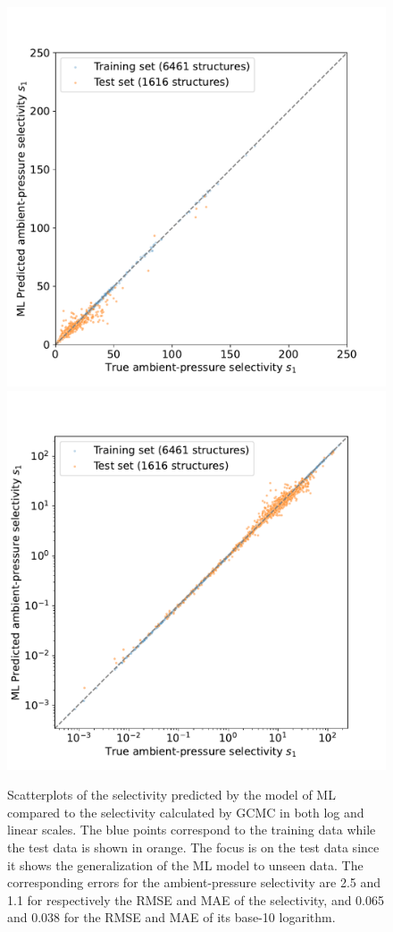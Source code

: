 \documentclass[main]{subfiles}
\begin{document}
\begin{figure}[ht]
  \centering
    \includegraphics[width=0.48\linewidth]{figures/4-ml/SI_figure/Scatterplot_S1_prediction.pdf}
    \hfill
    \includegraphics[width=0.48\linewidth]{figures/4-ml/SI_figure/Scatterplot_S1_prediction_logscale.pdf}
    \caption{Scatterplots of the selectivity predicted by the model of ML compared to the selectivity calculated by GCMC in both log and linear scales. The blue points correspond to the training data while the test data is shown in orange. The focus is on the test data since it shows the generalization of the ML model to unseen data. The corresponding errors for the ambient-pressure selectivity are 2.5 and 1.1 for respectively the RMSE and MAE of the selectivity, and 0.065 and 0.038 for the RMSE and MAE of its base-10 logarithm. }\label{fgr:S1_prediction}
  \end{figure}
\end{document}
